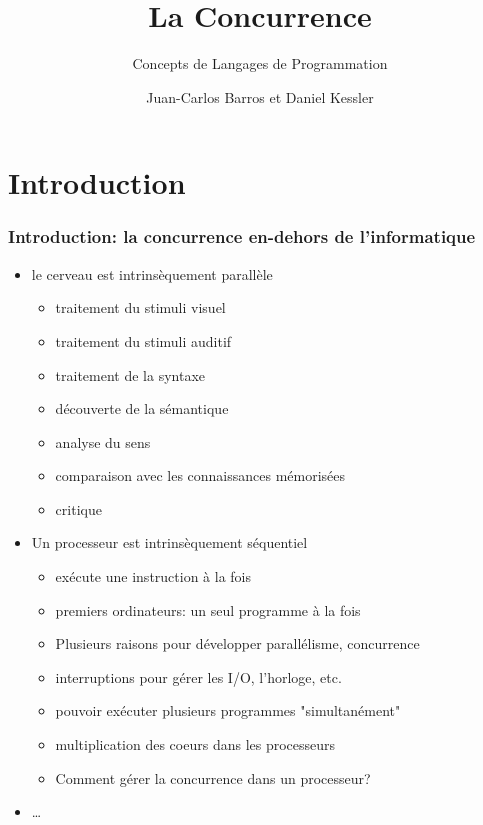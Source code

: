 \documentclass{beamer}
\title{La Concurrence}
\subtitle{Concepts de Langages de Programmation}
\author{Juan-Carlos Barros et Daniel Kessler}
\begin{document}
\begin{frame}
  \titlepage
\end{frame}

\begin{frame}
  \tableofcontents
\end{frame}

\section{Introduction}
\begin{frame}
  \frametitle{Introduction: la concurrence en-dehors de l'informatique}
  \begin{itemize}
  \item le cerveau est intrinsèquement parallèle
   \begin{itemize}
   \item traitement du stimuli visuel
   \item traitement du stimuli auditif
   \item traitement de la syntaxe
   \item découverte de la sémantique
   \item analyse du sens
   \item comparaison avec les connaissances mémorisées
   \item critique
  \end{itemize}
  \item Un processeur est intrinsèquement séquentiel
   \begin{itemize}
   \item exécute une instruction à la fois
   \item premiers ordinateurs: un seul programme à la fois
   \item Plusieurs raisons pour développer parallélisme, concurrence
   \item interruptions pour gérer les I/O, l'horloge, etc.
   \item pouvoir exécuter plusieurs programmes "simultanément"
   \item multiplication des coeurs dans les processeurs
   \item Comment gérer la concurrence dans un processeur?
  \end{itemize}

  \item \ldots
  \end{itemize}
\end{frame}
\end{document}

